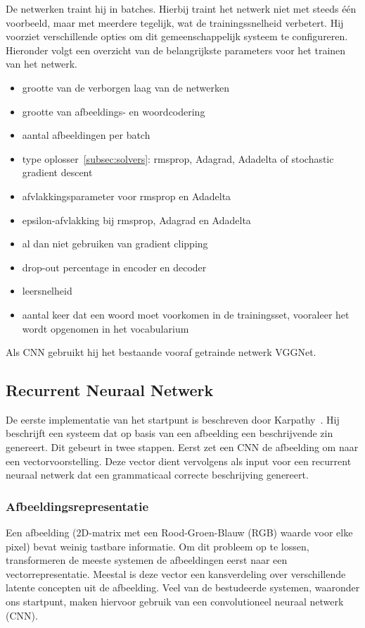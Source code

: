 De netwerken traint hij in batches. Hierbij traint het netwerk niet met steeds \'e\'en voorbeeld, maar met meerdere tegelijk, wat de trainingssnelheid verbetert. 
Hij voorziet verschillende opties om dit gemeenschappelijk systeem te configureren. Hieronder volgt een overzicht van de belangrijkste parameters voor het trainen van het netwerk.
\begin{itemize}
	\item grootte van de verborgen laag van de netwerken
	\item grootte van afbeeldings- en woordcodering
	\item aantal afbeeldingen per batch
	\item type oplosser~\ref{subsec:solvers}: rmsprop, Adagrad, Adadelta of stochastic gradient descent 
	\item afvlakkingsparameter voor rmsprop en Adadelta
	\item epsilon-afvlakking bij rmsprop, Adagrad en Adadelta
	\item al dan niet gebruiken van gradient clipping
	\item drop-out percentage in encoder en decoder
	\item leersnelheid
	\item aantal keer dat een woord moet voorkomen in de trainingsset, vooraleer het wordt opgenomen in het vocabularium
\end{itemize}
Als CNN gebruikt hij het bestaande vooraf getrainde netwerk VGGNet.

\subsection{Recurrent Neuraal Netwerk}
\label{sec:rnn_methodology}
De eerste implementatie van het startpunt is beschreven door Karpathy~\cite{Karpathy2015}. Hij beschrijft een systeem dat op basis van een afbeelding een beschrijvende zin genereert. Dit gebeurt in twee stappen. Eerst zet een CNN de afbeelding om naar een vectorvoorstelling. Deze vector dient vervolgens als input voor een recurrent neuraal netwerk dat een grammaticaal correcte beschrijving genereert.

\subsubsection{Afbeeldingsrepresentatie}
\label{sec:usedcnn}
Een afbeelding (2D-matrix met een Rood-Groen-Blauw (RGB) waarde voor elke pixel) bevat weinig tastbare informatie. Om dit probleem op te lossen, transformeren de meeste systemen de afbeeldingen eerst naar een vectorrepresentatie. Meestal is deze vector een kansverdeling over verschillende latente concepten uit de afbeelding. Veel van de bestudeerde systemen, waaronder ons startpunt, maken hiervoor gebruik van een convolutioneel neuraal netwerk (CNN).

